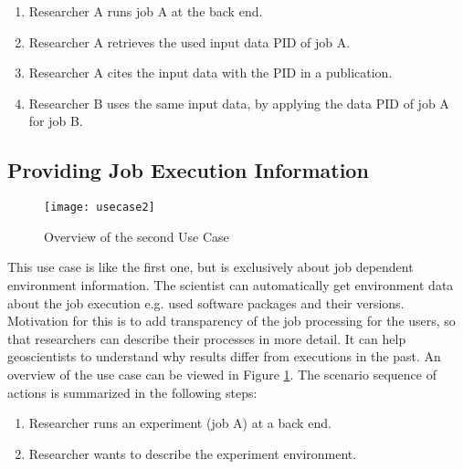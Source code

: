 \documentclass[draft,final]{vutinfth} %
\begin{document}
\begin{enumerate}
	\item Researcher A runs job A at the back end.
	\item Researcher A retrieves the used input data PID of job A.
	\item Researcher A cites the input data with the PID in a publication.
	\item Researcher B uses the same input data, by applying the data PID of job A for job B.  
\end{enumerate}

\subsection{Providing Job Execution Information}\label{UseCase2}
\begin{figure}[h]
	\centering
	\texttt{[image: usecase2]}
	\caption{Overview of the second Use Case}
	\label{fig:usecase2} %
\end{figure}

This use case is like the first one, but is exclusively about job dependent environment information. The scientist can automatically get environment data about the job execution e.g. used software packages and their versions. Motivation for this is to add transparency of the job processing for the users, so that researchers can describe their processes in more detail. It can help geoscientists to understand why results differ from executions in the past. An overview of the use case can be viewed in Figure \ref{fig:usecase2}. 
The scenario sequence of actions is summarized in the following steps: \\
\begin{enumerate}
	\item Researcher runs an experiment (job A) at a back end.
	\item Researcher wants to describe the experiment environment.
\end{enumerate}
\end{document}
